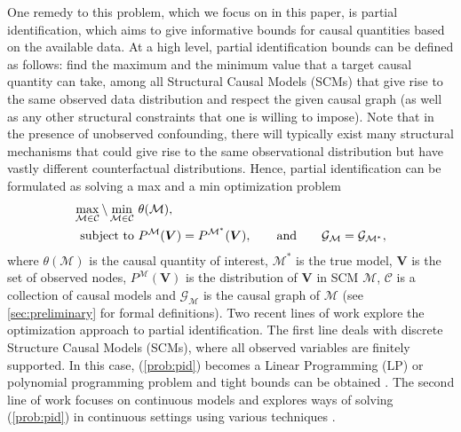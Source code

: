 \documentclass[12pt]{article}
\theoremstyle{plain}
\theoremstyle{definition}
\theoremstyle{remark}
\begin{document}
One remedy to this problem, which we focus on in this paper, is partial identification, which aims to give informative bounds for causal quantities based on the available data. At a high level, partial identification bounds can be defined as follows: find the maximum and the minimum value that a target causal quantity can take, among all Structural Causal Models (SCMs) that give rise to the same observed data distribution and respect the given causal graph (as well as any other structural constraints that one is willing to impose). Note that in the presence of unobserved confounding, there will typically exist many structural mechanisms that could give rise to the same observational distribution but have vastly different counterfactual distributions. 
Hence, partial identification can be formulated as solving a max and a min optimization problem \cite{balazadehPartialIdentificationTreatment2022}
\begin{align}
  \max_{\mathcal{M}\in \mathcal{C}} \backslash \min_{\mathcal{M}\in \mathcal{C}} & \  \mathcal{\theta(\mathcal{M})}, \label{prob:pid}\\
  \text{subject to} &\  P^{\mathcal{M}}(\boldsymbol{V}) = P^{\mathcal{M}^*}(\boldsymbol{V}) ,\quad\quad \text{and} \quad\quad \mathcal{G}_\mathcal{M} =\mathcal{G}_\mathcal{\mathcal{M}^*} \notag,
\end{align}
where $ \theta(\mathcal{M}) $ is the causal quantity of interest, $\mathcal{M}^*$ is the true model, $\boldsymbol{V}$ is the set of observed nodes, $P^\mathcal{M}(\boldsymbol{V})$ is the distribution of $\boldsymbol{V}$ in SCM $\mathcal{M}$, $ \mathcal{C} $ is a collection of causal models and $\mathcal{G}_\mathcal{M}$ is the causal graph of $\mathcal{M}$ (see \cref{sec:preliminary} for formal definitions). 
Two recent lines of work explore the optimization approach to partial identification. The first line deals with discrete Structure Causal Models (SCMs), where all observed variables are finitely supported. In this case, (\ref{prob:pid}) becomes a Linear Programming (LP) or polynomial programming problem and tight bounds can be obtained \cite{manski1990nonparametric,balkeCounterfactualProbabilitiesComputational1994,balkeBoundsTreatmentEffects1997,heckmanInstrumentalVariablesSelection2001,ramsahaiCausalBoundsObservable2012,richardsonNonparametricBoundsSensitivity2014,milesPartialIdentificationPure2015,bonetInstrumentalityTestsRevisited2013,zhangBoundingCausalEffects2021,zhangPartialCounterfactualIdentification2021a,duarteAutomatedApproachCausal2021}. The second line of work focuses on continuous models and explores ways of solving (\ref{prob:pid}) in continuous settings using various techniques  \cite{gunsiliusPathsamplingMethodPartially2020,kilbertusClassAlgorithmsGeneral2020,huGenerativeAdversarialFramework2021,maoGenerativeInterventionsCausal2021,balazadehPartialIdentificationTreatment2022,padhStochasticCausalProgramming2023}. \par
\end{document}

